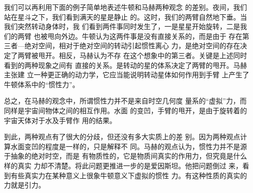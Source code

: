 我们可以再利用下面的例子简单地表述牛顿和马赫两种观念
的差别。夜间，我们站在星斗之下，我们看到满天的星是静止
的。这时，我们的两臂自然地下垂。当我们突然转动身体时，我
们看到两件事同时发生了，一是星星开始旋转，二是我们的两臂
也被甩向外边。牛顿认为这两件事是没有直接关系的，而是由于
存在第三者—绝对空间，相对于绝对空间的转动引起惯性离心
力，是绝对空间的存在决定了两臂被甩开。相反，马赫认为不存
在这个想象中的第三者。关键是上述同时看到的两种现象之间有
直接的关系。是转动的星的体系决定了两臂的甩开。马赫主张建
立一种更正确的动力学，它应当能说明转动星体如何作用到手臂
上产生了牛顿体系中的“惯性力”。

总之，在马赫的观念中，所谓惯性力并不是来自时空几何度
量系的“虚拟”力，而同样是宇宙间物体之间的相互作用。水面
的变凹，手臂的甩开，是由于旋转着的宇宙天体对于水及手臂作
用的结果。

到此，两种观点有了很大的分歧，但还没有多大实质上的差
别。因为两种观点计算水面变凹的程度是一样的，只是解释不
同。马赫的观点认为，惯性力并不是源于抽象的绝对时空，而是
有物质性的，它是物质间真实的作用力，但究竟是什么样的真实
力却不清楚。将此问题更推进一步的是爱因斯坦。他把问题倒过
来，看到有些真实力在某种意义上很象牛顿意义下虚拟的惯性
力。有这种性质的真实的力就是引力。

